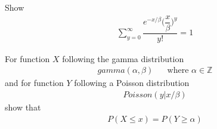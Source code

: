 \begin{exercise}
Show 
\begin{align*}
    \sum_{y = 0}^{\infty} \dfrac{e^{-x/\beta}\Big(\dfrac{x}{\beta}\Big)^{y}}{y!} = 1
\end{align*}
\end{exercise}

\begin{exercise}
For function $X$ following the gamma distribution 
\begin{align*}
    gamma(\alpha, \beta) \hspace{20pt} \text{where} \hspace{4pt} \alpha \in \mathbb{Z}
\end{align*}
and for function $Y$ following a Poisson distribution
\begin{align*}
    Poisson(y | x/\beta)
\end{align*}
show that
\begin{align*}
    P(X \leq x) = P(Y \geq \alpha)
\end{align*}
\end{exercise}